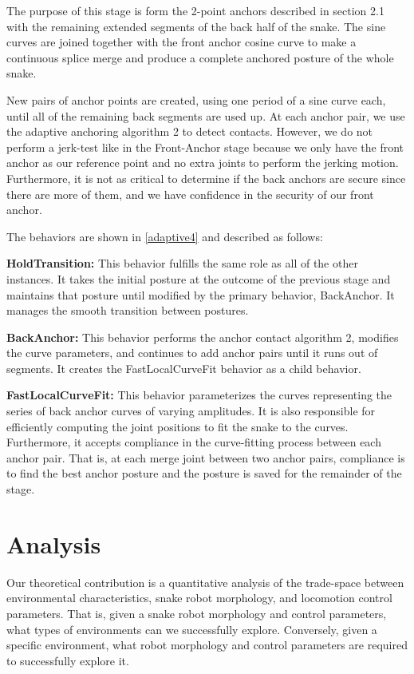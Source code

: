 

The purpose of this stage is form the 2-point anchors described in section 2.1 with the remaining extended segments of the back half of the snake. The sine curves are joined together with the front anchor cosine curve to make a continuous splice merge and produce a complete anchored posture of the whole snake.

New pairs of anchor points are created, using one period of a sine curve each, until all of the remaining back segments are used up. At each anchor pair, we use the adaptive anchoring algorithm 2 to detect contacts. However, we do not perform a jerk-test like in the Front-Anchor stage because we only have the front anchor as our reference point and no extra joints to perform the jerking motion. Furthermore, it is not as critical to determine if the back anchors are secure since there are more of them, and we have confidence in the security of our front anchor.

The behaviors are shown in \autoref{adaptive4} and described as follows:

\textbf{HoldTransition:}
This behavior fulfills the same role as all of the other instances. It takes the initial posture at the outcome of the previous stage and maintains that posture until modified by the primary behavior, BackAnchor. It manages the smooth transition between postures.

\textbf{BackAnchor:}
This behavior performs the anchor contact algorithm 2, modifies the curve parameters, and continues to add anchor pairs until it runs out of segments. It creates the FastLocalCurveFit behavior as a child behavior.

\textbf{FastLocalCurveFit:}
This behavior parameterizes the curves representing the series of back anchor curves of varying amplitudes. It is also responsible for efficiently computing the joint positions to fit the snake to the curves. Furthermore, it accepts compliance in the curve-fitting process between each anchor pair. That is, at each merge joint between two anchor pairs, compliance is to find the best anchor posture and the posture is saved for the remainder of the stage.

\section{Analysis}
\label{analysis}

Our theoretical contribution is a quantitative analysis of the trade-space between environmental characteristics, snake robot morphology, and locomotion control parameters. That is, given a snake robot morphology and control parameters, what types of environments can we successfully explore. Conversely, given a specific environment, what robot morphology and control parameters are required to successfully explore it.

